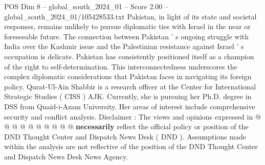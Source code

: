 \begin{textsample}{POS Dim 8 – global\_south\_2024\_01 – Score 2.00 – global\_south\_2024\_01/105428533.txt}
Pakistan, in light of its state and societal responses, remains unlikely to pursue diplomatic ties with Israel in the near or foreseeable future.
The connection between Pakistan ' s ongoing struggle with India over the Kashmir issue and the Palestinian resistance against Israel ' s occupation is delicate.
Pakistan has consistently positioned itself as a champion of the right to self-determination.
This interconnectedness underscores the complex diplomatic considerations that Pakistan faces in navigating its foreign policy.
Qurat-Ul-Ain Shabbir is a research officer at the Center for International Strategic Studies ( CISS ) AJK.
Currently, she is pursuing her Ph.D. degree in DSS from Quaid-i-Azam University.
Her areas of interest include comprehensive security and conflict analysis.
Disclaimer : The views and opinions expressed in @ @ @ @ @ @ @ @ @ @ \textbf{necessarily} reflect the official policy or position of the DND Thought Center and Dispatch News Desk ( DND ).
Assumptions made within the analysis are not reflective of the position of the DND Thought Center and Dispatch News Desk News Agency.

\end{textsample}
